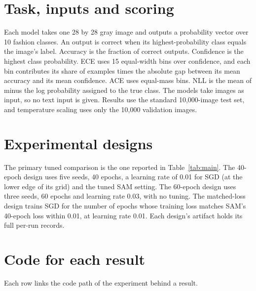 \documentclass[11pt,letterpaper]{article}
\begin{document}
\section{Task, inputs and scoring}
Each model takes one 28 by 28 gray image and outputs a probability vector over 10 fashion classes. An output is correct when its highest-probability class equals the image's label. Accuracy is the fraction of correct outputs. Confidence is the highest class probability. ECE uses 15 equal-width bins over confidence, and each bin contributes its share of examples times the absolute gap between its mean accuracy and its mean confidence. ACE uses equal-mass bins. NLL is the mean of minus the log probability assigned to the true class. The models take images as input, so no text input is given. Results use the standard 10,000-image test set, and temperature scaling uses only the 10,000 validation images.

\section{Experimental designs}
The primary tuned comparison is the one reported in Table~\ref{tab:main}. The 40-epoch design uses five seeds, 40 epochs, a learning rate of 0.01 for SGD (at the lower edge of its grid) and the tuned SAM setting. The 60-epoch design uses three seeds, 60 epochs and learning rate 0.03, with no tuning. The matched-loss design trains SGD for the number of epochs whose training loss matches SAM's 40-epoch loss within 0.01, at learning rate 0.01. Each design's artifact holds its full per-run records.

\section{Code for each result}\label{app:code}
Each row links the code path of the experiment behind a result.
\end{document}
